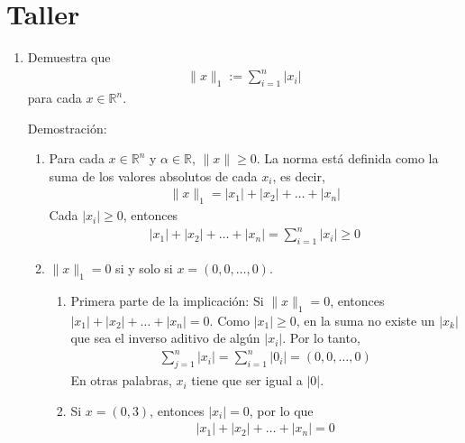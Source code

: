 \documentclass{report}
\begin{document}

    \section*{Taller}

    \begin{enumerate}
        \item Demuestra que
        \begin{align*}
            \|x\|_1 := \sum_{i=1}^n \left| x_i \right|
        \end{align*}
        para cada $x \in \mathbb{R}^n$.
    
        Demostración:
        \begin{enumerate}
            \item Para cada $x \in \mathbb{R}^n$ y $\alpha \in \mathbb{R}$, $\|x\| \geq 0$. La norma está definida como la suma de los valores absolutos de cada $x_i$, es decir,
            \begin{align*}
                \|x\|_1 = \left| x_1 \right| + \left| x_2 \right| + \ldots + \left| x_n \right|
            \end{align*}
            Cada $\left| x_i \right| \geqslant 0$, entonces
            \begin{align*}
                \left| x_1 \right| + \left| x_2 \right| + \ldots + \left| x_n \right| = \sum_{i=1}^n \left| x_i \right| \geq 0
            \end{align*}
            
            \item $\|x\|_1 = 0$ si y solo si $x = (0,0, \ldots, 0)$.
            \begin{enumerate}
                \item Primera parte de la implicación: Si $\|x\|_1 = 0$, entonces $\left| x_1 \right| + \left| x_2 \right| + \ldots + \left| x_n \right| = 0$. Como $\left| x_1 \right| \geq 0$, en la suma no existe un $\left| x_k \right|$ que sea el inverso aditivo de algún $\left| x_i \right|$. Por lo tanto,
                \begin{align*}
                    \sum_{j=1}^n \left| x_i \right| = \sum_{i=1}^n \left| 0_i \right| = (0,0, \ldots, 0)
                \end{align*}
                En otras palabras, $x_i$ tiene que ser igual a $|0|$.
                \item Si $x = (0,3)$, entonces $\left| x_i \right| = 0$, por lo que
                \begin{align*}
                    \left| x_1 \right| + \left| x_2 \right| + \ldots + \left| x_n \right| = 0
                \end{align*}
            \end{enumerate}
            

\end{enumerate}
\end{enumerate}
\end{document}
